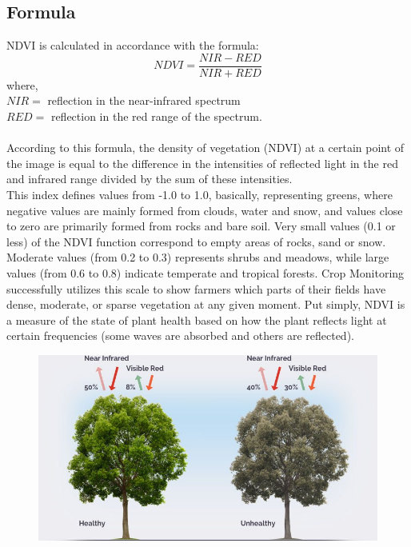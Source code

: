 \documentclass[12pt, a4paper]{report}
\begin{document}
\subsection{Formula}
NDVI is calculated in accordance with the formula:
\begin{displaymath}
NDVI=\frac{NIR-RED}{NIR+RED}
\end{displaymath}
where,\\
$NIR=$ reflection in the near-infrared spectrum\\
$RED=$ reflection in the red range of the spectrum.
\paragraph{}
According to this formula, the density of vegetation (NDVI) at a certain point of the image is equal to the difference in the intensities of reflected light in the red and infrared range divided by the sum of these intensities.\\
This index defines values from -1.0 to 1.0, basically, representing greens, where negative values are mainly formed from clouds, water and snow, and values close to zero are primarily formed from rocks and bare soil. Very small values (0.1 or less) of the NDVI
function correspond to empty areas of rocks, sand or snow. Moderate values (from 0.2 to 0.3) represents shrubs and meadows, while large values (from 0.6 to 0.8) indicate temperate and tropical forests. Crop Monitoring successfully utilizes this scale to show farmers which parts of their fields have dense, moderate, or sparse vegetation at any given moment. Put simply, NDVI is a measure of the state of plant health based on how the plant reflects light at certain frequencies (some waves are absorbed and others are reflected).
\begin{figure}[h]
\centering
\includegraphics[width=\textwidth]{ndviillustration.jpg}
\end{figure}
\end{document}
